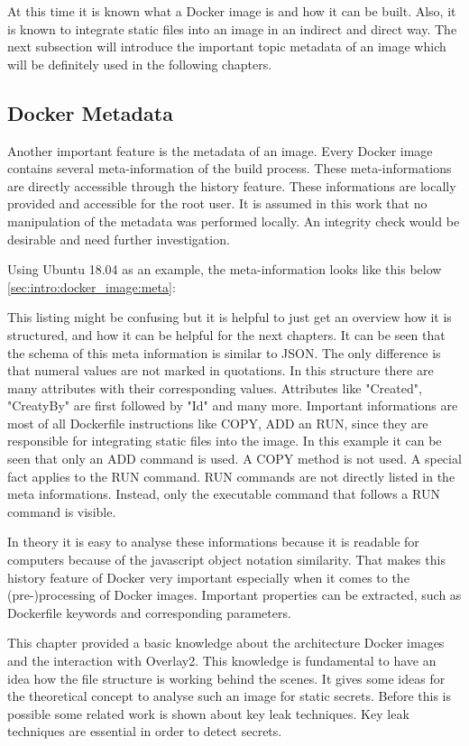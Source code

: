 At this time it is known what a Docker image is and how it can be built. Also, it is known to integrate static files into an image in an indirect and direct way.  The next subsection will introduce the important topic metadata of an image which will be definitely used in the following chapters. 

\subsection{Docker Metadata}
\label{sec:intro:docker_image:docker_img:meta}
Another important feature is the metadata of an image. Every Docker image contains several meta-information of the build process. These meta-informations are directly accessible through the history feature. 
These informations are locally provided and accessible for the root user. 
It is assumed in this work that no manipulation of the metadata was performed locally. An integrity check would be desirable and need further investigation.

Using Ubuntu 18.04 as an example, the meta-information looks like this below \ref{sec:intro:docker_image:meta}:

This listing might be confusing but it is helpful to just get an overview how it is structured, and how it can be helpful for the next chapters.
It can be seen that the schema of this meta information is similar to JSON. The only difference is that numeral values are not marked in quotations. In this structure there are many attributes with their corresponding values. Attributes like "Created", "CreatyBy" are first followed by "Id" and many more. 	
Important informations are most of all Dockerfile instructions like COPY, ADD an RUN, since they are responsible for integrating static files into the image.
In this example it can be seen that only an ADD command is used. A COPY method is not used.
A special fact applies to the RUN command. RUN commands are not directly listed in the meta informations.
Instead, only the executable command that follows a RUN command is visible.

In theory it is easy to analyse these informations because it is readable for computers because of the javascript object notation similarity.
That makes this history feature of Docker very important especially when it comes to the (pre-)processing of Docker images.	 Important properties can be extracted, such as Dockerfile keywords and corresponding parameters.

This chapter provided a basic knowledge about the architecture Docker images and the interaction with Overlay2. This knowledge is fundamental to have an idea how the file structure is working behind the scenes. It gives some ideas for the theoretical concept to analyse such an image for static secrets.
Before this is possible some related work is shown about key leak techniques. Key leak techniques are essential in order to detect secrets.